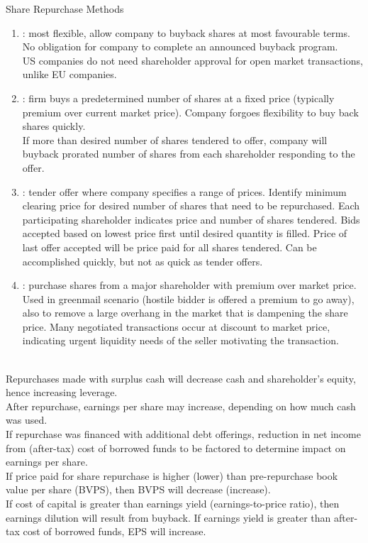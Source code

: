 \begin{remark} Share Repurchase Methods
\begin{enumerate}[label=\roman*.]
\setlength{\itemsep}{0pt}
\item {}: most flexible, allow company to buyback shares at most favourable terms. No obligation for company to complete an announced buyback program.\\
US companies do not need shareholder approval for open market transactions, unlike EU companies.
\item {}: firm buys a predetermined number of shares at a fixed price (typically premium over current market price). Company forgoes flexibility to buy back shares quickly.\\
If more than desired number of shares tendered to offer, company will buyback prorated number of shares from each shareholder responding to the offer.
\item {}: tender offer where company specifies a range of prices. Identify minimum clearing price for desired number of shares that need to be repurchased. Each participating shareholder indicates price and number of shares tendered. Bids accepted based on lowest price first until desired quantity is filled. Price of last offer accepted will be price paid for all shares tendered. Can be accomplished quickly, but not as quick as tender offers.
\item {}: purchase shares from a major shareholder with premium over market price. Used in greenmail scenario (hostile bidder is offered a premium to go away), also to remove a large overhang in the market that is dampening the share price. Many negotiated transactions occur at discount to market price, indicating urgent liquidity needs of the seller motivating the transaction.
\end{enumerate}
\end{remark}

\begin{remark} \\
Repurchases made with surplus cash will decrease cash and shareholder's equity, hence increasing leverage.\\
After repurchase, earnings per share may increase, depending on how much cash was used.\\
If repurchase was financed with additional debt offerings, reduction in net income from (after-tax) cost of borrowed funds to be factored to determine impact on earnings per share.\\
If price paid for share repurchase is higher (lower) than pre-repurchase book value per share (BVPS), then BVPS will decrease (increase).\\
If cost of capital is greater than earnings yield (earnings-to-price ratio), then earnings dilution will result from buyback. If earnings yield is greater than after-tax cost of borrowed funds, EPS will increase.
\end{remark}


